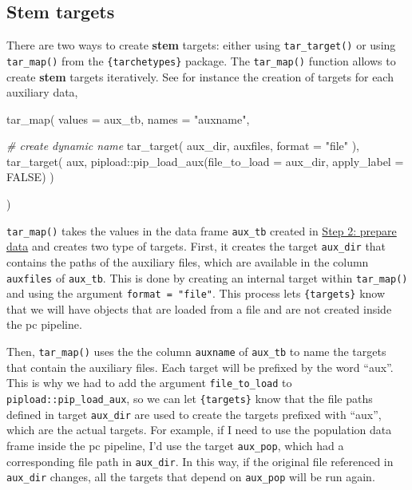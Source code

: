 \documentclass[
]{book}
\newenvironment{Shaded}{\begin{snugshade}}{\end{snugshade}}
\newcommand{\AttributeTok}[1]{\textcolor[rgb]{0.77,0.63,0.00}{#1}}
\newcommand{\CommentTok}[1]{\textcolor[rgb]{0.56,0.35,0.01}{\textit{#1}}}
\newcommand{\ConstantTok}[1]{\textcolor[rgb]{0.00,0.00,0.00}{#1}}
\newcommand{\FunctionTok}[1]{\textcolor[rgb]{0.00,0.00,0.00}{#1}}
\newcommand{\NormalTok}[1]{#1}
\newcommand{\SpecialCharTok}[1]{\textcolor[rgb]{0.00,0.00,0.00}{#1}}
\newcommand{\StringTok}[1]{\textcolor[rgb]{0.31,0.60,0.02}{#1}}
\begin{document}
\hypertarget{stem-targets}{%
\subsection*{Stem targets}\label{stem-targets}}

There are two ways to create \textbf{stem} targets: either using \texttt{tar\_target()} or
using \texttt{tar\_map()} from the \texttt{\{tarchetypes\}} package. The \texttt{tar\_map()} function
allows to create \textbf{stem} targets iteratively. See for instance the creation of
targets for each auxiliary data,

\begin{Shaded}
\begin{Highlighting}[]
\FunctionTok{tar\_map}\NormalTok{(}
  \AttributeTok{values =}\NormalTok{ aux\_tb, }
  \AttributeTok{names  =} \StringTok{"auxname"}\NormalTok{, }
  
  \CommentTok{\# create dynamic name}
  \FunctionTok{tar\_target}\NormalTok{(}
\NormalTok{    aux\_dir,}
\NormalTok{    auxfiles, }
    \AttributeTok{format =} \StringTok{"file"}
\NormalTok{  ), }
  \FunctionTok{tar\_target}\NormalTok{(}
\NormalTok{    aux,}
\NormalTok{    pipload}\SpecialCharTok{::}\FunctionTok{pip\_load\_aux}\NormalTok{(}\AttributeTok{file\_to\_load =}\NormalTok{ aux\_dir,}
                          \AttributeTok{apply\_label =} \ConstantTok{FALSE}\NormalTok{)}
\NormalTok{  )}
  
\NormalTok{)}
\end{Highlighting}
\end{Shaded}

\texttt{tar\_map()} takes the values in the data frame \texttt{aux\_tb} created in \protect\hyperlink{pipe-prepare-data}{Step 2:
prepare data} and creates two type of targets. First, it
creates the target \texttt{aux\_dir} that contains the paths of the auxiliary files,
which are available in the column \texttt{auxfiles} of \texttt{aux\_tb}. This is done by
creating an internal target within \texttt{tar\_map()} and using the argument
\texttt{format\ =\ "file"}. This process lets \texttt{\{targets\}} know that we will have objects
that are loaded from a file and are not created inside the pc pipeline.

Then, \texttt{tar\_map()} uses the the column \texttt{auxname} of \texttt{aux\_tb} to name the targets
that contain the auxiliary files. Each target will be prefixed by the word
``aux''. This is why we had to add the argument \texttt{file\_to\_load} to
\texttt{pipload::pip\_load\_aux}, so we can let \texttt{\{targets\}} know that the file paths
defined in target \texttt{aux\_dir} are used to create the targets prefixed with ``aux'',
which are the actual targets. For example, if I need to use the population data
frame inside the pc pipeline, I'd use the target \texttt{aux\_pop}, which had a
corresponding file path in \texttt{aux\_dir}. In this way, if the original file
referenced in \texttt{aux\_dir} changes, all the targets that depend on \texttt{aux\_pop} will
be run again.
\end{document}

